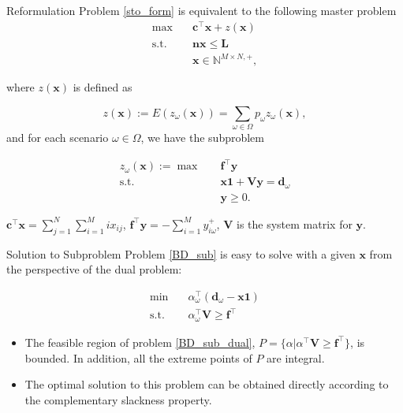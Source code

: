 \begin{frame}{Reformulation}
  \small
  Problem \eqref{sto_form} is equivalent to the following master problem
  \begin{equation}\label{BD_master}
    \begin{aligned}
  \max \quad & \mathbf{c}^{\intercal} \mathbf{x}+ z(\mathbf{x}) \\
  \text {s.t.} \quad & \mathbf{n} \mathbf{x} \leq \mathbf{L} \\
  & \mathbf{x} \in \mathbb{N}^{M \times N, +},
  \end{aligned}
  \end{equation}

  where $z(\mathbf{x})$ is defined as 

$$z(\mathbf{x}) := E(z_{\omega}(\mathbf{x})) = \sum_{\omega \in \Omega} p_{\omega} z_{\omega}(\mathbf{x}),$$ and for each scenario $\omega \in \Omega$, we have the subproblem

  \begin{equation}\label{BD_sub}
    \begin{aligned}
      z_{\omega}(\mathbf{x}) := \max \quad & \mathbf{f}^{\intercal} \mathbf{y} \\
      \text {s.t.} \quad & \mathbf{x} \mathbf{1} + \mathbf{V} \mathbf{y} = \mathbf{d}_{\omega} \\
       & \mathbf{y} \geq 0.
    \end{aligned}
    \end{equation}

    \begin{tiny}
    $\mathbf{c}^{\intercal} \mathbf{x} =\sum_{j=1}^{N} \sum_{i=1}^{M} i x_{ij}$, $\mathbf{f}^{\intercal} \mathbf{y} = - \sum_{i=1}^{M} y_{i \omega}^{+}$, $\mathbf{V}$ is the system matrix for $\mathbf{y}$.
    \end{tiny}
\end{frame}

\begin{frame}{Solution to Subproblem}
  Problem \eqref{BD_sub} is easy to solve with a given $\mathbf{x}$ from the perspective of the dual problem:

  \begin{equation}\label{BD_sub_dual}
    \begin{aligned}
      \min \quad & \alpha^{\intercal}_{\omega} (\mathbf{d}_{\omega}- \mathbf{x} \mathbf{1}) \\
      \text {s.t.} \quad & \alpha^{\intercal}_{\omega} \mathbf{V} \geq \mathbf{f}^{\intercal}
    \end{aligned}
    \end{equation}

    \begin{itemize}
      \item The feasible region of problem \eqref{BD_sub_dual}, $P= \{\alpha|\alpha^{\intercal} \mathbf{V} \geq \mathbf{f}^{\intercal}\}$, is bounded. In addition, all the extreme points of $P$ are integral.
      \item The optimal solution to this problem can be obtained directly according to the complementary slackness property.
    \end{itemize}
\end{frame}

